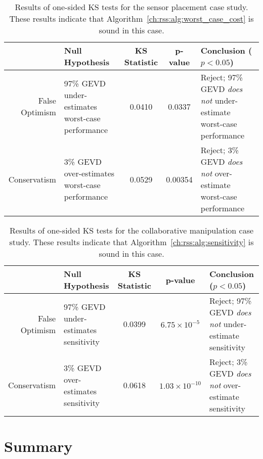 \begin{table}[thb]
	\renewcommand{\arraystretch}{1.5}
	\centering
	\begin{tabular}{r||p{4cm}|c|c|p{5cm}}
		               & Null Hypothesis                                  & \shortstack{KS                                                                                       \\ Statistic} & p-value & Conclusion ($p < 0.05$)                                                   \\ \hline\hline
		False Optimism & 97\% GEVD under-estimates worst-case performance & 0.0410         & 0.0337  & Reject; 97\% GEVD \textit{does not} under-estimate worst-case performance \\ \hline
		Conservatism   & 3\% GEVD over-estimates worst-case performance   & 0.0529         & 0.00354 & Reject; 3\% GEVD \textit{does not} over-estimate worst-case performance
	\end{tabular}
	\caption{Results of one-sided KS tests for the sensor placement case study. These results indicate that Algorithm~\ref{ch:rss:alg:worst_case_cost} is sound in this case.}\label{ch:rss:tab:ks_test_agv}
\end{table}

\begin{table}[thb]
	\renewcommand{\arraystretch}{1.5}
	\centering
	\begin{tabular}{r||p{4cm}|c|c|p{5cm}}
		               & Null Hypothesis                       & \shortstack{KS                                                                                         \\ Statistic} & p-value              & Conclusion ($p < 0.05$)                                        \\ \hline\hline
		False Optimism & 97\% GEVD under-estimates sensitivity & 0.0399         & $6.75\times10^{-5}$  & Reject; 97\% GEVD \textit{does not} under-estimate sensitivity \\ \hline
		Conservatism   & 3\% GEVD over-estimates sensitivity   & 0.0618         & $1.03\times10^{-10}$ & Reject; 3\% GEVD \textit{does not} over-estimate sensitivity
	\end{tabular}
	\caption{Results of one-sided KS tests for the collaborative manipulation case study. These results indicate that Algorithm~\ref{ch:rss:alg:sensitivity} is sound in this case.}\label{ch:rss:tab:ks_test_mam}
\end{table}

\section{Summary}

